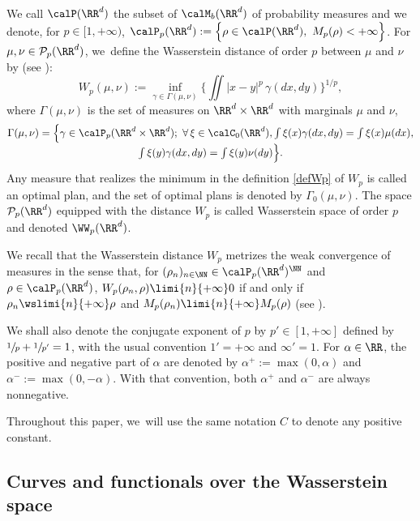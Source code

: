 We call $\calP(\RR^d)$ the subset of $\calM_b(\RR^d)$ of probability measures and we denote, for $p \in [1, +\infty)$, $\calP_p(\RR^d) := \left\{\rho \in \calP(\RR^d),\ M_p(\rho) < +\infty\right\}$. For $\mu, \nu \in {\mathcal P}_{p}(\RR^d)$, we~define the Wasserstein distance of order $p$ between $\mu$ and $\nu$ by (see \cite{ambrosio08, otam15, villani_topics}):\vspace*{-3pt}
\begin{equation}\label{defWp}
W_p(\mu,\nu) := \inf_{\gamma\in \Gamma(\mu,\nu)} \biggl\{\iint |x-y|^p\,\gamma(dx,dy)\biggr\}^{1/p},
\end{equation}
where $\Gamma(\mu,\nu)$ is the set of measures on $\RR^d\times\RR^d$ with marginals $\mu$ and $\nu$, \ie\vspace*{-5pt}
\begin{multline*}
\Gamma(\mu,\nu) = \Bigl\{ \textstyle\gamma\in \calP_p(\RR^d\times\RR^d); \ \forall\, \xi\in \calC_0(\RR^d), \int \xi(x)\gamma(dx,dy) = \int \xi(x) \mu(dx), \\[-3pt]
\textstyle\int \xi(y)\gamma(dx,dy) = \int \xi(y) \nu(dy) \Bigr\}.
\end{multline*}
Any measure that realizes the minimum in the definition \eqref{defWp}
of $W_p$ is called an optimal plan, and the set of optimal plans is denoted by $\Gamma_0(\mu,\nu)$. The space ${\mathcal P}_{p}(\RR^d)$ equipped with the distance $W_p$ is called Wasserstein space of order $p$ and denoted $\WW_p(\RR^d)$.

We recall that the Wasserstein distance $W_p$ metrizes the weak convergence of measures in the sense that, for $(\rho_n)_{n\in\NN} \in \calP_p(\RR^d)^\NN$ and $\rho \in \calP_p(\RR^d)$, $W_p(\rho_n, \rho) \limi{n}{+\infty} 0$ if and only if $\rho_n \wslimi{n}{+\infty} \rho$ and $M_p(\rho_n) \limi{n}{+\infty} M_p(\rho)$ (see \cite[Th.\,7.12]{villani_topics}).

We shall also denote the conjugate exponent of $p$ by $p' \in [1, +\infty]$ defined by $\sfrac{1}{p} + \sfrac{1}{p'} = 1$, with the usual convention $1' = +\infty$ and $\infty' = 1$. For $\alpha \in \RR$, the positive and negative part of $\alpha$ are denoted by $\alpha^+ := \max(0,\alpha)$ and $\alpha^- := \max(0,-\alpha)$. With that convention, both $\alpha^+$ and $\alpha^-$ are always nonnegative.

Throughout this paper, we~will use the same notation $C$ to denote any positive constant.

\subsection{Curves and functionals over the Wasserstein space}

